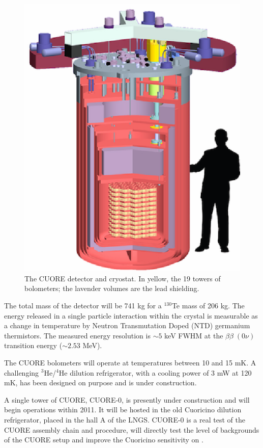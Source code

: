 \begin{figure}[t!]
\begin{center}
\includegraphics[scale=.8]{img/cuore.eps}
\end{center}
\caption{The CUORE detector and cryostat. In yellow, the 19 towers of bolometers; the lavender volumes are the lead shielding.}\label{fig:cuore}
\end{figure}

The total mass of the detector will be 741 kg for a $^{130}$Te mass of 206 kg. The energy released in a single particle interaction within the crystal is measurable as a change in temperature by  Neutron Transmutation Doped (NTD) germanium thermistors. The measured energy resolution is $\sim 5$ keV FWHM at the $\beta \beta \; (0\nu)$ transition energy ($\sim 2.53$ MeV).

The CUORE bolometers will operate at temperatures between 10 and 15 mK. A challenging $^3$He/$^4$He dilution refrigerator, with a cooling power of 3 mW at 120 mK, has been designed on purpose and is under construction.

A single tower of CUORE, CUORE-0, is presently under construction and will begin  operations within 2011. It will be hosted in the old Cuoricino dilution refrigerator, placed in the hall A of the LNGS. CUORE-0 is a real test of the CUORE assembly chain and procedure, will directly test the level of backgrounds of the CUORE setup and improve the Cuoricino sensitivity on \bbonu.

